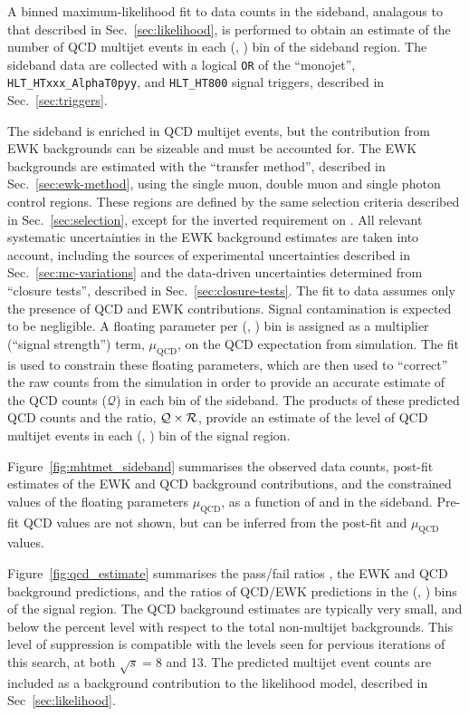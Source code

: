 A binned maximum-likelihood fit to data counts in the sideband,
analagous to that described in Sec.~\ref{sec:likelihood}, is performed
to obtain an estimate of the number of QCD multijet events in each
(\njet, \scalht) bin of the sideband region. The sideband data are
collected with a logical \verb!OR!  of the ``monojet'',
\verb!HLT_HTxxx_AlphaT0pyy!, and \verb!HLT_HT800!  signal triggers,
described in Sec.~\ref{sec:triggers}.

The sideband is enriched in QCD multijet events, but the contribution
from EWK backgrounds can be sizeable and must be accounted for. The
EWK backgrounds are estimated with the ``transfer method'', described
in Sec.~\ref{sec:ewk-method}, using the single muon, double muon and
single photon control regions. These regions are defined by the same
selection criteria described in Sec.~\ref{sec:selection}, except for
the inverted requirement on \mhtmet. All relevant systematic
uncertainties in the EWK background estimates are taken into account,
including the sources of experimental uncertainties described in
Sec.~\ref{sec:mc-variations} and the data-driven uncertainties
determined from ``closure tests'', described in
Sec.~\ref{sec:closure-tests}. The fit to data assumes only the
presence of QCD and EWK contributions. Signal contamination is
expected to be negligible. A floating parameter per (\njet, \scalht)
bin is assigned as a multiplier (``signal strength'') term,
$\mu_{\textrm{QCD}}$, on the QCD expectation from simulation. The fit
is used to constrain these floating parameters, which are then used to
``correct'' the raw counts from the simulation in order to provide an
accurate estimate of the QCD counts ($\mathcal{Q}$) in each bin of the
sideband. The products of these predicted QCD counts and the ratio,
$\mathcal{Q} \times \mbox{$\mathcal{R}$}$, provide an estimate of the level of QCD
multijet events in each (\njet, \scalht) bin of the signal region.

Figure~\ref{fig:mhtmet_sideband} summarises the observed data counts,
post-fit estimates of the EWK and QCD background contributions, and
the constrained values of the floating parameters
$\mu_{\textrm{QCD}}$, as a function of \njet and \scalht in the
\mhtmet sideband. Pre-fit QCD values are not shown, but can be
inferred from the post-fit and $\mu_{\textrm{QCD}}$ values. 

Figure~\ref{fig:qcd_estimate} summarises the pass/fail ratios
\rmhtmet, the EWK and QCD background predictions, and the ratios of
QCD/EWK predictions in the (\njet, \scalht) bins of the signal
region. The QCD background estimates are typically very small, and
below the percent level with respect to the total non-multijet
backgrounds. This level of suppression is compatible with the levels
seen for pervious iterations of this search, at both $\sqrt{s} = 8$
and 13\TeV. The predicted multijet event counts are included as a
background contribution to the likelihood model, described in
Sec~\ref{sec:likelihood}.

